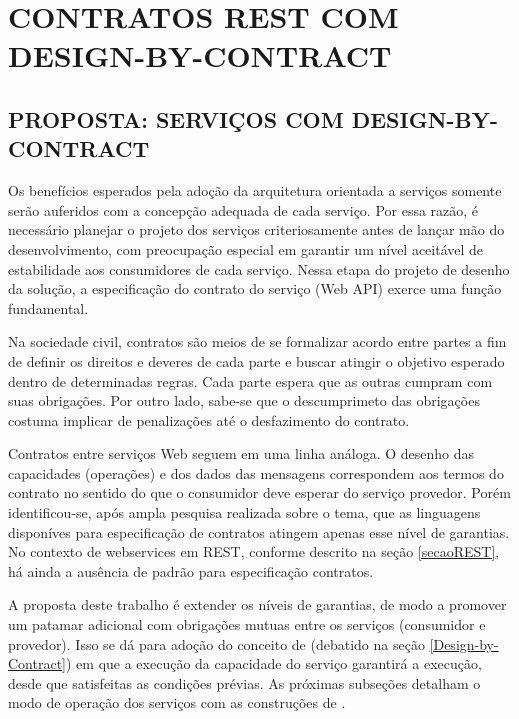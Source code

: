 \chapter{CONTRATOS REST COM DESIGN-BY-CONTRACT}


\section{PROPOSTA: SERVIÇOS COM DESIGN-BY-CONTRACT}
\label{PropostaServicoDbC}
\vspace{-6mm}

Os benefícios esperados pela adoção da arquitetura orientada a serviços
somente serão auferidos com a concepção adequada de cada serviço. 
Por essa razão, é necessário planejar o projeto dos serviços criteriosamente
antes de lançar mão do desenvolvimento, com preocupação especial em garantir
um nível aceitável de estabilidade aos consumidores de cada serviço.
Nessa etapa do projeto de desenho da solução, a especificação do contrato do
serviço (Web API) exerce uma função fundamental. 

Na sociedade civil, contratos são meios de se formalizar acordo entre partes a
fim de definir os direitos e deveres de cada parte e buscar atingir o
objetivo esperado dentro de determinadas regras. Cada parte espera que as outras
cumpram com suas obrigações.
Por outro lado, sabe-se que o descumprimeto das obrigações costuma implicar de
penalizações até o desfazimento do contrato. 

Contratos entre serviços Web seguem em uma linha análoga. O desenho das
capacidades (operações) e dos dados das mensagens correspondem aos
termos do contrato no sentido do que o consumidor deve esperar do serviço
provedor. Porém identificou-se, após ampla pesquisa realizada sobre o tema, que
as linguagens disponíves para especificação de contratos atingem apenas esse
nível de garantias. No contexto de webservices em REST, conforme descrito na
seção \ref{secaoREST}, há ainda a ausência de padrão para especificação
contratos.

A proposta deste trabalho é extender os níveis de garantias, de modo a promover
um patamar adicional com obrigações mutuas entre os serviços (consumidor e
provedor). Isso se dá para adoção do conceito de \designbycontract{} (debatido
na seção \ref{Design-by-Contract}) em que a execução da
capacidade do serviço garantirá a execução, desde que satisfeitas as condições
prévias. As próximas subseções detalham o modo de operação dos serviços com as
construções de \designbycontract{}.

